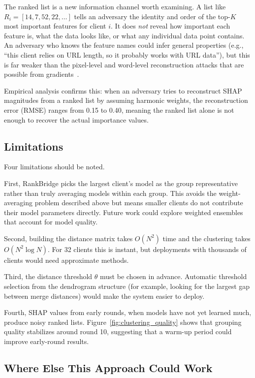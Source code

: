 \documentclass[12pt,a4paper]{article}
\begin{document}
The ranked list is a new information channel worth examining. A list like $R_i = [14, 7, 52, 22, \ldots]$ tells an adversary the identity and order of the top-$K$ most important features for client $i$. It does \textit{not} reveal how important each feature is, what the data looks like, or what any individual data point contains. An adversary who knows the feature names could infer general properties (e.g., ``this client relies on URL length, so it probably works with URL data''), but this is far weaker than the pixel-level and word-level reconstruction attacks that are possible from gradients~\cite{zhu2019deepleakage}.

Empirical analysis confirms this: when an adversary tries to reconstruct SHAP magnitudes from a ranked list by assuming harmonic weights, the reconstruction error (RMSE) ranges from 0.15 to 0.40, meaning the ranked list alone is not enough to recover the actual importance values.

\subsection{Limitations}

Four limitations should be noted.

First, RankBridge picks the largest client's model as the group representative rather than truly averaging models within each group. This avoids the weight-averaging problem described above but means smaller clients do not contribute their model parameters directly. Future work could explore weighted ensembles that account for model quality.

Second, building the distance matrix takes $O(N^2)$ time and the clustering takes $O(N^2 \log N)$. For 32 clients this is instant, but deployments with thousands of clients would need approximate methods.

Third, the distance threshold $\theta$ must be chosen in advance. Automatic threshold selection from the dendrogram structure (for example, looking for the largest gap between merge distances) would make the system easier to deploy.

Fourth, SHAP values from early rounds, when models have not yet learned much, produce noisy ranked lists. Figure~\ref{fig:clustering_quality} shows that grouping quality stabilizes around round 10, suggesting that a warm-up period could improve early-round results.

\subsection{Where Else This Approach Could Work}
\end{document}
